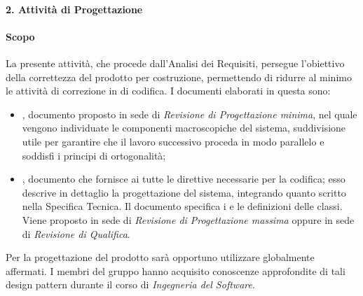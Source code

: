 			
		\paragraph*{2. Attività di Progettazione}
			\paragraph*{Scopo}
		        La presente attivit\`a, che procede dall'Analisi dei Requisiti, persegue l'obiettivo
		        della correttezza del prodotto per costruzione, permettendo di ridurre al minimo le attività di correzione
		        in  di codifica.
                        I documenti elaborati in questa  sono:
                        \begin{itemize}
                        \item {}, documento proposto in sede di \textit{Revisione di Progettazione minima}, nel quale vengono individuate 
			 le componenti macroscopiche del sistema, suddivisione utile per garantire che il lavoro successivo proceda in modo parallelo e soddisfi i principi di ortogonalità;
                        \item {}, documento che fornisce ai  tutte le direttive necessarie per la codifica;
					    esso descrive in dettaglio la progettazione del sistema, integrando quanto scritto nella Specifica Tecnica. Il documento specifica i   e le
					    definizioni delle classi. Viene proposto in sede di \textit{Revisione di Progettazione massima} oppure in sede di \textit{Revisione di Qualifica}.
                        \end{itemize}
		        Per la progettazione del prodotto sarà opportuno utilizzare  globalmente affermati.
			I membri del gruppo hanno acquisito conoscenze approfondite di tali design pattern durante il corso di \textit{Ingegneria del Software}.
                 
